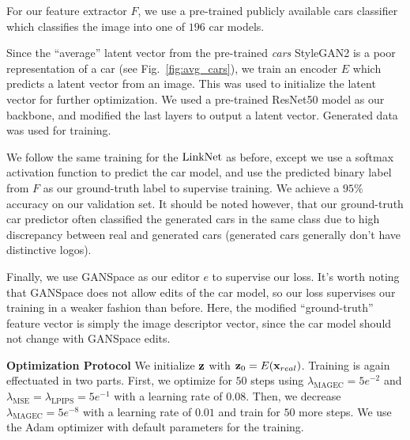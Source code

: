 For our feature extractor $F$, we use a pre-trained publicly available cars 
classifier \citep{pretrained_cars} which classifies the image 
into one of $196$ car models.

Since the ``average''
latent vector from the pre-trained \emph{cars} StyleGAN2 is a 
poor representation of a car
(see Fig.~\ref{fig:avg_cars}), we train an encoder 
$E$ which predicts a latent vector from an image. This was 
used to initialize the latent vector for further optimization.
We used a pre-trained ResNet50 model \citep{he2016resnet} 
as our backbone, and modified the last layers to output
a latent vector. Generated data was used for training.


We follow the same training for the $\mathrm{LinkNet}$ as before, except we use a 
softmax activation function to predict the car model, and use the 
predicted binary label from $F$ as our ground-truth label to supervise 
training. We achieve a $95\%$
accuracy on our validation set. It should be noted however, that our ground-truth 
   car predictor often classified the generated cars in the same class 
   due to high discrepancy
    between real and generated cars (generated cars generally
     don't have distinctive logos).

 Finally, we use GANSpace 
 \citep{harkonen2020ganspace} as our editor $e$ to supervise our \magec loss. 
 It's worth noting
that GANSpace does not allow edits of the car model, so our
\magec loss supervises our training in a weaker fashion than 
 before. Here, the modified ``ground-truth'' feature vector is 
 simply the image descriptor vector, since the car model should 
 not change with GANSpace edits.


\noindent \textbf{Optimization Protocol}  We initialize $\mathbf{z}$ with
 $\mathbf{z}_0 = E(\mathbf{x}_{real})$. Training is again effectuated in two parts.
  First, we optimize for $50$ steps using 
  $\lambda_{\text{MAGEC}}=5e^{-2}$ and $\lambda_{\text{MSE}} = \lambda_{\text{LPIPS}} = 5e^{-1}$ 
  with a learning rate of $0.08$. Then, we decrease 
  $\lambda_{\text{MAGEC}}=5e^{-8}$ with a learning rate of $0.01$ and 
  train for $50$ more steps. We use the Adam optimizer \citep{adam}
  with default parameters for  
  the training.



